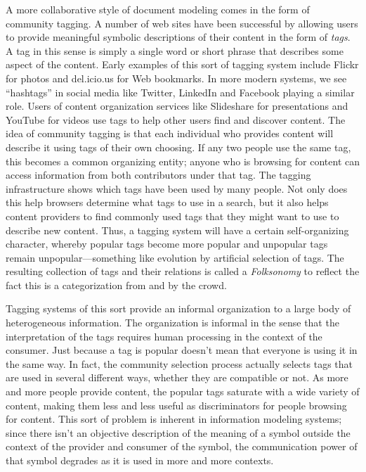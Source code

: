 A more collaborative style of document modeling comes in the form of
community tagging. A number of web sites have been successful by
allowing users to provide meaningful symbolic descriptions of their
content in the form of \emph{tags}. A tag in this sense is simply a
single word or short phrase that describes some aspect of the content.
Early examples of this sort of tagging system include Flickr for photos
and del.icio.us for Web bookmarks. In more modern systems, we see
``hashtags'' in social media like Twitter, LinkedIn and Facebook playing
a similar role. Users of content organization services like Slideshare
for presentations and YouTube for videos use tags to help other users
find and discover content. The idea of community tagging is that each
individual who provides content will describe it using tags of their own
choosing. If any two people use the same tag, this becomes a common
organizing entity; anyone who is browsing for content can access
information from both contributors under that tag. The tagging
infrastructure shows which tags have been used by many people. Not only
does this help browsers determine what tags to use in a search, but it
also helps content providers to find commonly used tags that they might
want to use to describe new content. Thus, a tagging system will have a
certain self-organizing character, whereby popular tags become more
popular and unpopular tags remain unpopular---something like evolution
by artificial selection of tags. The resulting collection of tags and
their relations is called a \emph{Folksonomy} to reflect the fact this
is a categorization from and by the crowd.

Tagging systems of this sort provide an informal organization to a large
body of heterogeneous information. The organization is informal in the
sense that the interpretation of the tags requires human processing in
the context of the consumer. Just because a tag is popular doesn't mean
that everyone is using it in the same way. In fact, the community
selection process actually selects tags that are used in several
different ways, whether they are compatible or not. As more and more
people provide content, the popular tags saturate with a wide variety of
content, making them less and less useful as discriminators for people
browsing for content. This sort of problem is inherent in information
modeling systems; since there isn't an objective description of the
meaning of a symbol outside the context of the provider and consumer of
the symbol, the communication power of that symbol degrades as it is
used in more and more contexts.

